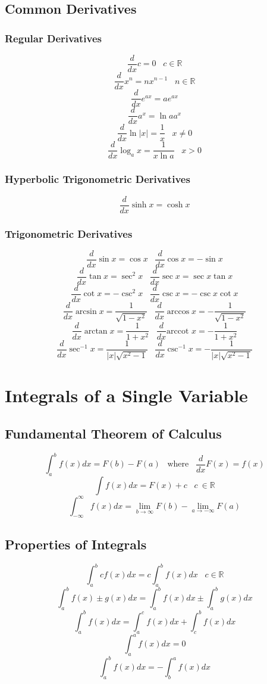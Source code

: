 \documentclass[12pt]{book}
\newcommand{\liminfty}[1]{\lim_{#1 \to \infty}}
\newcommand{\R}{\mathbb{R}}
\newcommand{\dydx}[2]{\frac{d #1}{d #2}}
\begin{document}
\subsection{Common Derivatives}
\subsubsection{Regular Derivatives}
\[
\dydx{}{x} c = 0 \;\;\; c\in\R
\]
\[
\dydx{}{x} x^n = nx^{n-1} \;\;\; n \in \R
\]
\[
\dydx{}{x} e^{ax} = ae^{ax}
\]
\[
\dydx{}{x} a^x = \ln{a}a^x
\]
\[
\dydx{}{x} \ln{|x|} = \frac{1}{x} \;\;\; x\neq 0
\]
\[
\dydx{}{x} \log_a x = \frac{1}{x\ln{a}} \;\;\; x>0
\]
\subsubsection{Hyperbolic Trigonometric Derivatives}
\[
\dydx{}{x} \sinh{x} = \cosh{x}
\]
\subsubsection{Trigonometric Derivatives}
\[
\dydx{}{x}\sin x = \cos x \;\;\; \dydx{}{x} \cos x = -\sin x
\]
\[
\dydx{}{x} \tan x = \sec ^2 x \;\;\; \dydx{}{x} \sec x = \sec x \tan x
\]
\[
\dydx{}{x} \cot x = - \csc ^2 x \;\;\; \dydx{}{x} \csc x = -\csc x \cot x
\]
\[
\dydx{}{x}  \arcsin x = \frac{1}{\sqrt{1-x^2}} \;\;\; \dydx{}{x} \arccos x =- \frac{1}{\sqrt{1-x^2}}
\]
\[
\dydx{}{x} \arctan x = \frac{1}{1+x^2} \;\;\; \dydx{}{x}\text{arccot } x = -\frac{1}{1+x^2}
\]
\[
\dydx{}{x} \sec ^{-1} x = \frac{1}{|x| \sqrt{x^2-1}} \;\;\; \dydx{}{x} \csc ^{-1} x =  - \frac{1}{|x| \sqrt{x^2-1}}
\]
\section{Integrals of a Single Variable}
\subsection{Fundamental Theorem of Calculus}

\[
\int_{a}^{b} f(x) dx = F(b) - F(a) \;\;\; \text{where} \;\;\; \dydx{}{x} F(x) = f(x)
\]
\[
\int f(x) dx = F(x) + c \;\;\; c \ \in \R
\]
\[
\int_{-\infty}^{\infty} f(x) dx = \liminfty{b} F(b) - \lim_{a \to -\infty} F(a)
\]
\subsection{Properties of Integrals}
\[
\int_{a}^{b} cf(x) dx = c\int_{a}^{b} f(x) dx \;\;\; c \in \R
\]
\[
\int_{a}^{b} f(x) \pm g(x) dx = \int_{a}^{b} f(x) dx \pm \int_{a}^{b} g(x) dx
\]
\[
\int_{a}^{b} f(x) dx = \int_{a}^{c} f(x) dx + \int_{c}^{b} f(x) dx
\]
\[
\int_{a}^{a} f(x) dx = 0
\]
\[
\int_{a}^{b} f(x) dx = - \int_{b}^{a} f(x) dx
\]
\end{document}
